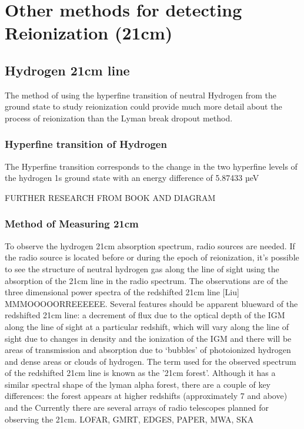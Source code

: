 
\section{Other methods for detecting Reionization (21cm)} %
\label{sec:other_methods21cm}

    \subsection{Hydrogen 21cm line} %
    \label{sub:Hydrogen_21cm}

The method of using the hyperfine transition of neutral Hydrogen from the ground state to study reionization could provide much more detail about the process of reionization than the Lyman break dropout method.

         \subsubsection{Hyperfine transition of Hydrogen} %
         \label{subsub:Hyperfine_Hydrogen}

The Hyperfine transition corresponds to the change in the two hyperfine levels of the hydrogen 1s ground state with an energy difference of 5.87433 µeV

FURTHER RESEARCH FROM BOOK AND DIAGRAM
    
	
         \subsubsection{Method of Measuring 21cm} %
	\label{subsub:Measuring_21cm} 

To observe the hydrogen 21cm absorption spectrum, radio sources are needed. If the radio source is located before or during the epoch of reionization, it’s possible to see the structure of neutral hydrogen gas along the line of sight using the absorption of the 21cm line in the radio spectrum. The observations are of the three dimensional power spectra of the redshifted  21cm line [Liu] MMMOOOOORREEEEEE.  Several features should be apparent blueward of the redshifted 21cm line: a decrement of flux due to the optical depth of the IGM along the line of sight at a particular redshift, which will vary along the line of sight due to changes in density and the ionization of the IGM and there will be areas of transmission and absorption due to ‘bubbles’ of photoionized hydrogen and dense areas or clouds of hydrogen. The term used for the observed spectrum of the redshifted 21cm line is known as the '21cm forest'. Although it has a similar spectral shape of the lyman alpha forest, there are a couple of key differences: the forest appears at higher redshifts (approximately 7 and above) and  the   Currently there are several arrays of radio telescopes planned for observing the 21cm. LOFAR, GMRT, EDGES, PAPER, MWA, SKA

